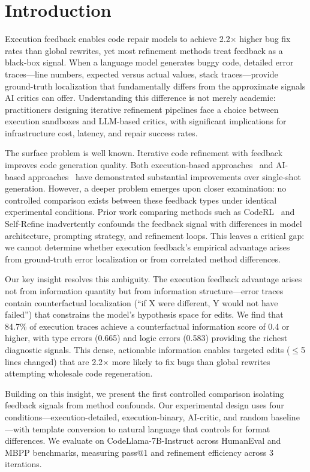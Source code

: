 \section{Introduction}
\label{sec:introduction}

Execution feedback enables code repair models to achieve 2.2$\times$ higher bug fix rates than global rewrites, yet most refinement methods treat feedback as a black-box signal. When a language model generates buggy code, detailed error traces---line numbers, expected versus actual values, stack traces---provide ground-truth localization that fundamentally differs from the approximate signals AI critics can offer. Understanding this difference is not merely academic: practitioners designing iterative refinement pipelines face a choice between execution sandboxes and LLM-based critics, with significant implications for infrastructure cost, latency, and repair success rates.

The surface problem is well known. Iterative code refinement with feedback improves code generation quality. Both execution-based approaches~\cite{chen2023selfdebug} and AI-based approaches~\cite{madaan2023selfrefine} have demonstrated substantial improvements over single-shot generation. However, a deeper problem emerges upon closer examination: no controlled comparison exists between these feedback types under identical experimental conditions. Prior work comparing methods such as CodeRL~\cite{le2022coderl} and Self-Refine inadvertently confounds the feedback signal with differences in model architecture, prompting strategy, and refinement loops. This leaves a critical gap: we cannot determine whether execution feedback's empirical advantage arises from ground-truth error localization or from correlated method differences.

Our key insight resolves this ambiguity. The execution feedback advantage arises not from information quantity but from information structure---error traces contain counterfactual localization (``if X were different, Y would not have failed'') that constrains the model's hypothesis space for edits. We find that 84.7\% of execution traces achieve a counterfactual information score of 0.4 or higher, with type errors (0.665) and logic errors (0.583) providing the richest diagnostic signals. This dense, actionable information enables targeted edits ($\leq$5 lines changed) that are 2.2$\times$ more likely to fix bugs than global rewrites attempting wholesale code regeneration.

Building on this insight, we present the first controlled comparison isolating feedback signals from method confounds. Our experimental design uses four conditions---execution-detailed, execution-binary, AI-critic, and random baseline---with template conversion to natural language that controls for format differences. We evaluate on CodeLlama-7B-Instruct across HumanEval and MBPP benchmarks, measuring pass@1 and refinement efficiency across 3 iterations.

